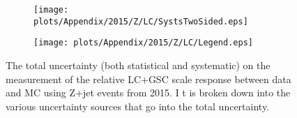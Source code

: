 \begin{figure}[!ht]
\captionsetup[subfigure]{labelformat=empty}
 \begin{center}
   \begin{subfigure}{0.55\textwidth}
     \hspace{-3cm}
     \texttt{[image: plots/Appendix/2015/Z/LC/SystsTwoSided.eps]}
   \end{subfigure}
   \begin{subfigure}{0.55\textwidth}
     \hspace{-3cm}
     \texttt{[image: plots/Appendix/2015/Z/LC/Legend.eps]}
   \end{subfigure}
 \end{center}
 \caption[Uncertainty on the LC+GSC scale response measurement using Z+jet]
 {\small The total uncertainty (both statistical and systematic) on the measurement of the relative LC+GSC scale response between data and MC using Z+jet events from 2015.  I
t is broken down into the various uncertainty sources that go into the total uncertainty.  }
 \label{Fig:ZJetSystsLC2015}
\end{figure}



